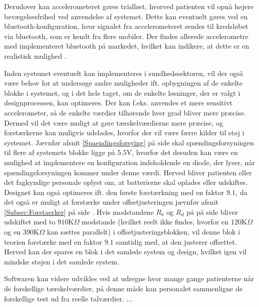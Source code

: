 Derudover kan accelerometeret gøres trådløst, hvorved patienten vil opnå højere bevægelsesfrihed ved anvendelse af systemet. Dette kan eventuelt gøres ved en bluetooth-konfiguration, hvor signalet fra accelerometeret sendes til kredsløbet via bluetooth, som er kendt fra flere mobiler. Der findes allerede accelerometre med implementeret bluetooth på markedet, hvilket kan indikere, at dette er en realistisk mulighed \cite{Axivity2015, Bioradio2015}. 

Inden systemet eventuelt kan implementeres i sundhedssektoren, vil der også være behov for at undersøge andre muligheder ift. opbygningen af de enkelte blokke i systemet, og i det hele taget, om de enkelte løsninger, der er valgt i designprocessen, kan optimeres. Der kan f.eks. anvendes et mere sensitivt accelerometer, så de enkelte værdier tilhørende hver grad bliver mere præcise. Dermed vil det være muligt at gøre tærskelværdierne mere præcise, og forstærkerne kan muligvis udelades, hvorfor der vil være færre kilder til støj i systemet. Jævnfør afsnit \ref{Spaendingsforsying} på side \pageref{Spaendingsforsying} skal spændingsforsyningen til flere af systemets blokke ligge på $5.5$V, hvorfor det desuden kan være en mulighed at implementere en konfiguration indeholdende en diode, der lyser, når spændingsforsyningen kommer under denne værdi. Herved bliver patienten eller det fagkyndige personale oplyst om, at batterierne skal oplades eller udskiftes. \\
Designet kan også optimeres ift. den første forstærkning med en faktor $9.1$, da det også er muligt at forstærke under offsetjusteringen jævnfør afsnit \ref{Subsec:Forstaerker} på side \pageref{Subsec:Forstaerker}. Hvis modstandene $R_{b}$ og $R_{d}$ på  på side \pageref{fig:Forstaerker_faktor18} bliver udskiftet med to $910$K$\Omega$ modstande (hvilket reelt ikke findes, hvorfor en $120$K$\Omega$ og en $390$K$\Omega$ kan sættes parallelt) i offsetjusteringsblokken, vil denne blok i teorien forstærke med en faktor $9.1$ samtidig med, at den justerer offsettet. Herved kan der spares en blok i det samlede system og design, hvilket igen vil mindske støjen i det samlede system.

Softwaren kan videre udvikles ved at udregne hvor mange gange patienterne når de forskellige tærskelværdier, på denne måde kan personalet sammenligne de forskellige test ud fra reelle talværdier. ...
